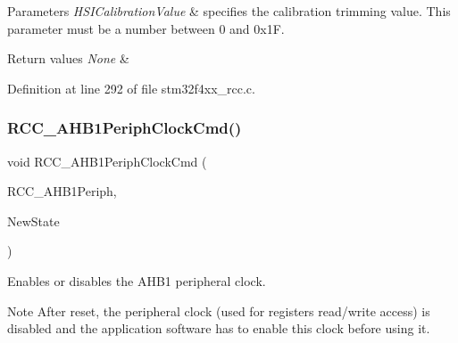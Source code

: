 \begin{DoxyParams}{Parameters}
{\em H\+S\+I\+Calibration\+Value} & specifies the calibration trimming value. This parameter must be a number between 0 and 0x1F. \\
\hline
\end{DoxyParams}

\begin{DoxyRetVals}{Return values}
{\em None} & \\
\hline
\end{DoxyRetVals}


Definition at line 292 of file stm32f4xx\+\_\+rcc.\+c.

\mbox{\label{group___r_c_c_ga80c89116820d48bb38db2e7d5e5a49b9}} 
\subsubsection{\texorpdfstring{R\+C\+C\+\_\+\+A\+H\+B1\+Periph\+Clock\+Cmd()}{RCC\_AHB1PeriphClockCmd()}}
{\footnotesize\ttfamily void R\+C\+C\+\_\+\+A\+H\+B1\+Periph\+Clock\+Cmd (\begin{DoxyParamCaption}\item[{uint32\+\_\+t}]{R\+C\+C\+\_\+\+A\+H\+B1\+Periph,  }\item[{Functional\+State}]{New\+State }\end{DoxyParamCaption})}



Enables or disables the A\+H\+B1 peripheral clock. 

\begin{DoxyNote}{Note}
After reset, the peripheral clock (used for registers read/write access) is disabled and the application software has to enable this clock before using it. 
\end{DoxyNote}

